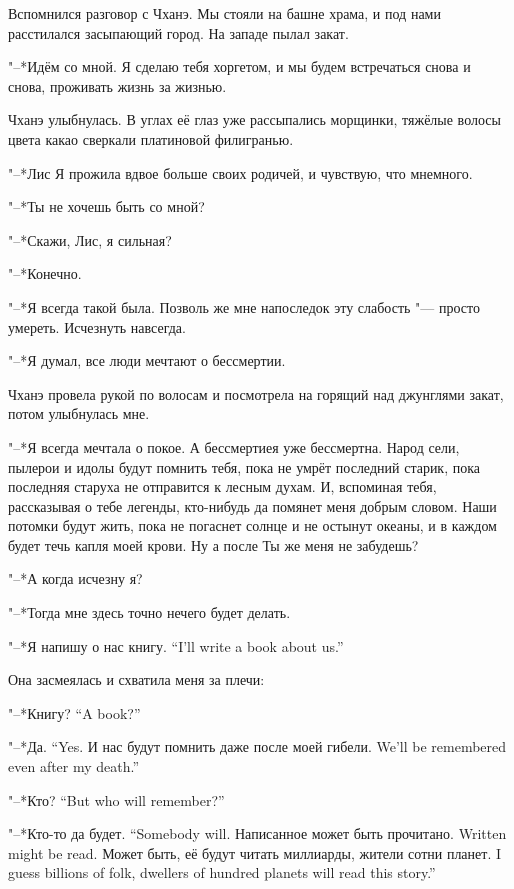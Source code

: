 Вспомнился разговор с Чханэ.
Мы стояли на башне храма, и под нами расстилался засыпающий город.
На западе пылал закат.

"--*Идём со мной.
Я сделаю тебя хоргетом, и мы будем встречаться снова и снова, проживать жизнь за жизнью.

Чханэ улыбнулась.
В углах её глаз уже рассыпались морщинки, тяжёлые волосы цвета какао сверкали платиновой филигранью.

"--*Лис\ldotst
Я прожила вдвое больше своих родичей, и чувствую, что мне\ldotst много.

"--*Ты не хочешь быть со мной?

"--*Скажи, Лис, я сильная?

"--*Конечно.

"--*Я всегда такой была.
Позволь же мне напоследок эту слабость "--- просто умереть.
Исчезнуть навсегда.

"--*Я думал, все люди мечтают о бессмертии.

Чханэ провела рукой по волосам и посмотрела на горящий над джунглями закат, потом улыбнулась мне.

"--*Я всегда мечтала о покое.
А бессмертие\ldotst я уже бессмертна.
Народ сели, пылерои и идолы будут помнить тебя, пока не умрёт последний старик, пока последняя старуха не отправится к лесным духам.
И, вспоминая тебя, рассказывая о тебе легенды, кто-нибудь да помянет меня добрым словом.
Наши потомки будут жить, пока не погаснет солнце и не остынут океаны, и в каждом будет течь капля моей крови.
Ну а после\ldotst
Ты же меня не забудешь?

"--*А когда исчезну я?

"--*Тогда мне здесь точно нечего будет делать.

{"--*Я напишу о нас книгу.}
{``I'll write a book about us.''}

Она засмеялась и схватила меня за плечи:

{"--*Книгу?}
{``A book?''}

{"--*Да.}
{``Yes.}
{И нас будут помнить даже после моей гибели.}
{We'll be remembered even after my death.''}

{"--*Кто?}
{``But who will remember?''}

{"--*Кто-то да будет.}
{``Somebody will.}
{Написанное может быть прочитано.}
{Written might be read.}
{Может быть, её будут читать миллиарды, жители сотни планет.}
{I guess billions of folk, dwellers of hundred planets will read this story.''}

